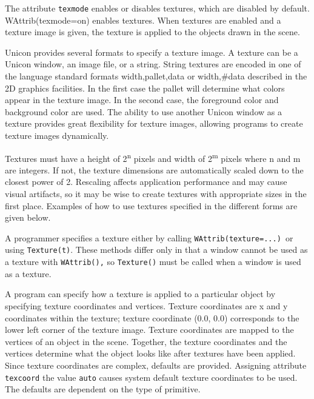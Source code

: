 The attribute \texttt{texmode} enables or disables textures,
which are disabled by default.
WAttrib({\textquotedbl}texmode=on{\textquotedbl}) enables textures.
When textures are enabled and a texture image is given, the texture
is applied to the objects drawn in the scene.

Unicon provides several formats to specify a texture image. A texture
can be a Unicon window, an image file, or a string. String textures
are encoded in one of the language standard
formats {\textquotedbl}width,pallet,data{\textquotedbl} or
{\textquotedbl}width,\#data{\textquotedbl} described in the 2D graphics
facilities. In the first case the pallet will determine what colors
appear in the texture image. In the second case, the foreground color
and background color are used. The ability to use another Unicon
window as a texture provides great flexibility for texture images,
allowing programs to create texture images dynamically.

Textures must have a height of 2\textsuperscript{n} pixels and width
of 2\textsuperscript{m} pixels where n and m are integers. If not, the
texture dimensions are automatically scaled down to the closest power
of 2. Rescaling affects application performance and may cause visual
artifacts, so it may be wise to create textures with appropriate sizes
in the first place. Examples of how to use textures specified in the
different forms are given below.

A programmer specifies a texture either by calling
\texttt{WAttrib({\textquotedbl}texture=...{\textquotedbl})}\texttt{ }or
using \texttt{Texture(t)}. These methods differ only in that a
window cannot be used as a texture with \texttt{WAttrib(),} so
\texttt{Texture()} must be called when a window is used as a texture.

A program can specify how a texture is applied to a particular object
by specifying texture coordinates and vertices. Texture
coordinates are x and y coordinates within the texture; texture
coordinate (0.0, 0.0) corresponds to the lower left corner of the
texture image. Texture coordinates are mapped to the vertices of an
object in the scene. Together, the texture coordinates and the vertices
determine what the object looks like after textures have been applied.
Since texture coordinates are complex, defaults are provided. Assigning
attribute \texttt{texcoord} the value \texttt{auto} causes system
default texture coordinates to be used. The defaults are dependent on
the type of primitive.

